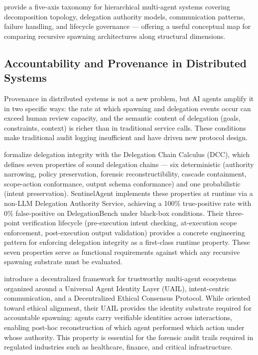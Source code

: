  provide a five-axis taxonomy for hierarchical multi-agent systems covering decomposition topology, delegation authority models, communication patterns, failure handling, and lifecycle governance --- offering a useful conceptual map for comparing recursive spawning architectures along structural dimensions.

\subsection{Accountability and Provenance in Distributed Systems}

Provenance in distributed systems is not a new problem, but AI agents amplify it in two specific ways: the rate at which spawning and delegation events occur can exceed human review capacity, and the semantic content of delegation (goals, constraints, context) is richer than in traditional service calls. These conditions make traditional audit logging insufficient and have driven new protocol design.

 formalize delegation integrity with the Delegation Chain Calculus (DCC), which defines seven properties of sound delegation chains --- six deterministic (authority narrowing, policy preservation, forensic reconstructibility, cascade containment, scope-action conformance, output schema conformance) and one probabilistic (intent preservation). SentinelAgent implements these properties at runtime via a non-LLM Delegation Authority Service, achieving a 100\% true-positive rate with 0\% false-positive on DelegationBench under black-box conditions. Their three-point verification lifecycle (pre-execution intent checking, at-execution scope enforcement, post-execution output validation) provides a concrete engineering pattern for enforcing delegation integrity as a first-class runtime property. These seven properties serve as functional requirements against which any recursive spawning substrate must be evaluated.

 introduce a decentralized framework for trustworthy multi-agent ecosystems organized around a Universal Agent Identity Layer (UAIL), intent-centric communication, and a Decentralized Ethical Consensus Protocol. While oriented toward ethical alignment, their UAIL provides the identity substrate required for accountable spawning: agents carry verifiable identities across interactions, enabling post-hoc reconstruction of which agent performed which action under whose authority. This property is essential for the forensic audit trails required in regulated industries such as healthcare, finance, and critical infrastructure.

